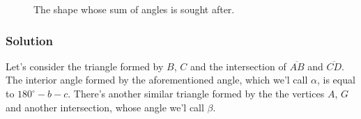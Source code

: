 \documentclass{article}
\newcommand{\solution}{\subsubsection*{\textcolor{MainColor}{Solution}}}
\theoremstyle{maintheorem}
\begin{document}
\begin{figure}[h]\label{starB}
    \centering

    \caption{The shape whose sum of angles is sought after.}
\end{figure}

\solution

Let's consider the triangle formed by $B$, $C$ and the intersection of $\overline{AB}$ and $\overline{CD}$.
The interior angle formed by the aforementioned angle, which we'l call $\alpha$, is equal to $180^\circ - b - c$.
There's another similar triangle formed by the the vertices $A$, $G$ and another intersection, whose angle we'l call $\beta$.
\end{document}
